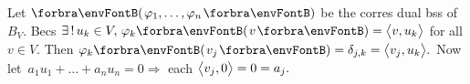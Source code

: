 
Let $\Par{\varphi_1,\dots,\varphi_n}$ be the corres dual bss of $B_V.$ \;Becs $\exists\,!\,u_k\in V,\,\varphi_k\Par{v}=\Ang{v,u_k}$ for all $v\in V.$\parSol{}
Then $\varphi_k\Par{v_j}=\delta_{j,k}=\Ang{v_j,u_k}.$ \;Now let \,$a_1u_1+\dots+a_nu_n=0\Rightarrow$ each $\big\langle{}v_j,0{}\big\rangle=0=a_j.$\PfEnd
\SepLine

